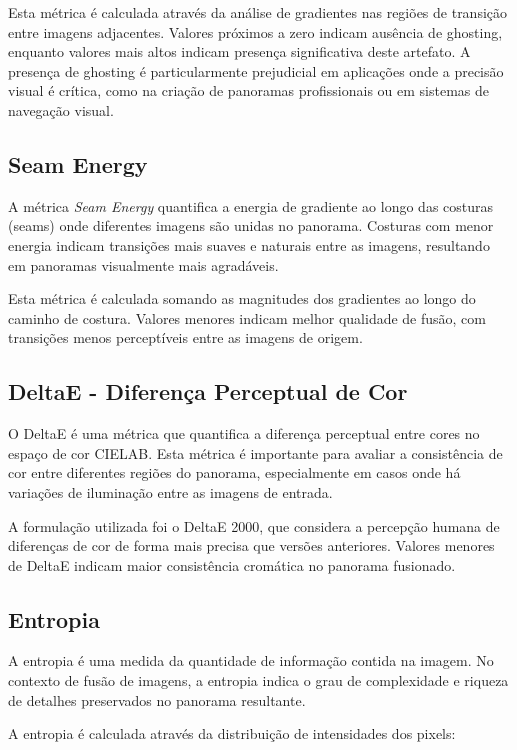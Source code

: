 Esta métrica é calculada através da análise de gradientes nas regiões de transição entre imagens adjacentes. Valores próximos a zero indicam ausência de ghosting, enquanto valores mais altos indicam presença significativa deste artefato. A presença de ghosting é particularmente prejudicial em aplicações onde a precisão visual é crítica, como na criação de panoramas profissionais ou em sistemas de navegação visual.

\subsection{Seam Energy}

A métrica \textit{Seam Energy} quantifica a energia de gradiente ao longo das costuras (seams) onde diferentes imagens são unidas no panorama. Costuras com menor energia indicam transições mais suaves e naturais entre as imagens, resultando em panoramas visualmente mais agradáveis.

Esta métrica é calculada somando as magnitudes dos gradientes ao longo do caminho de costura. Valores menores indicam melhor qualidade de fusão, com transições menos perceptíveis entre as imagens de origem.

\subsection{DeltaE - Diferença Perceptual de Cor}

O DeltaE é uma métrica que quantifica a diferença perceptual entre cores no espaço de cor CIELAB. Esta métrica é importante para avaliar a consistência de cor entre diferentes regiões do panorama, especialmente em casos onde há variações de iluminação entre as imagens de entrada.

A formulação utilizada foi o DeltaE 2000, que considera a percepção humana de diferenças de cor de forma mais precisa que versões anteriores. Valores menores de DeltaE indicam maior consistência cromática no panorama fusionado.

\subsection{Entropia}

A entropia é uma medida da quantidade de informação contida na imagem. No contexto de fusão de imagens, a entropia indica o grau de complexidade e riqueza de detalhes preservados no panorama resultante.

A entropia é calculada através da distribuição de intensidades dos pixels:

